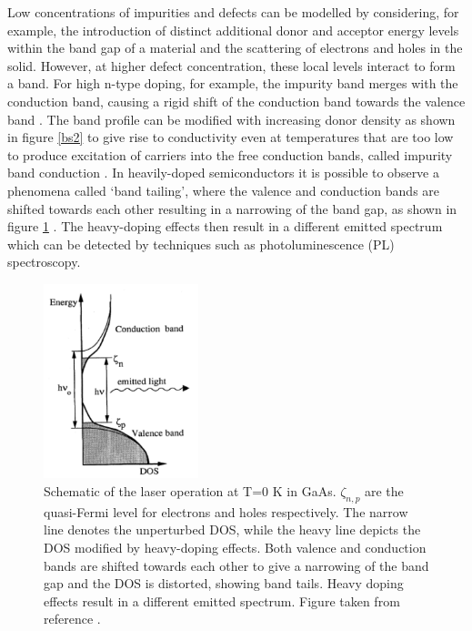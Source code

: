 Low concentrations of impurities and defects can be modelled by considering, for example, the introduction of distinct additional donor and acceptor energy levels within the band gap of a material and the scattering of electrons and holes in the solid. However, at higher defect concentration, these local levels interact to form a band. For high n-type doping, for example, the impurity band merges with the conduction band, causing a rigid shift of the conduction band towards the valence band \cite{Pankove}. The band profile can be modified with increasing donor density as shown in figure \ref{bs2} to give rise to conductivity even at temperatures that are too low to produce excitation of carriers into the free conduction bands, called impurity band conduction \cite{small_semiconductor2}.
In heavily-doped semiconductors it is possible to observe a phenomena called `band tailing', where the valence and conduction bands are shifted towards each other resulting in a narrowing of the band gap, as shown in figure \ref{pankove_band_tailing} \cite{Pankove}. The heavy-doping effects then result in a different emitted spectrum which can be detected by techniques such as photoluminescence (PL) spectroscopy. \\

\begin{figure}[h!]
  \centering
    \includegraphics[width=0.4\textwidth]{figures/pankove_band_tailing.png}
    \caption{Schematic of the laser operation at T=0 K in GaAs. $\zeta_{n,p}$ are the quasi-Fermi level for electrons and holes respectively. The narrow line denotes the unperturbed DOS, while the heavy line depicts the DOS modified by heavy-doping effects. Both valence and conduction bands are shifted towards each other to give a narrowing of the band gap and the DOS is distorted, showing band tails. Heavy doping effects result in a different emitted spectrum. Figure taken from reference .}
  \label{pankove_band_tailing}
\end{figure}

